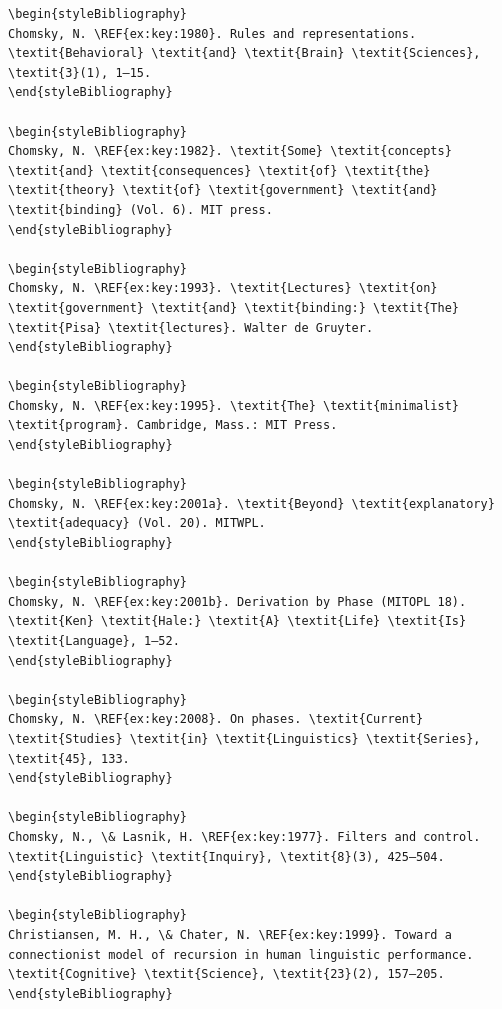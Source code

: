 \begin{verbatim}
\begin{styleBibliography}
Chomsky, N. \REF{ex:key:1980}. Rules and representations. \textit{Behavioral} \textit{and} \textit{Brain} \textit{Sciences}, \textit{3}(1), 1–15.
\end{styleBibliography}

\begin{styleBibliography}
Chomsky, N. \REF{ex:key:1982}. \textit{Some} \textit{concepts} \textit{and} \textit{consequences} \textit{of} \textit{the} \textit{theory} \textit{of} \textit{government} \textit{and} \textit{binding} (Vol. 6). MIT press.
\end{styleBibliography}

\begin{styleBibliography}
Chomsky, N. \REF{ex:key:1993}. \textit{Lectures} \textit{on} \textit{government} \textit{and} \textit{binding:} \textit{The} \textit{Pisa} \textit{lectures}. Walter de Gruyter.
\end{styleBibliography}

\begin{styleBibliography}
Chomsky, N. \REF{ex:key:1995}. \textit{The} \textit{minimalist} \textit{program}. Cambridge, Mass.: MIT Press.
\end{styleBibliography}

\begin{styleBibliography}
Chomsky, N. \REF{ex:key:2001a}. \textit{Beyond} \textit{explanatory} \textit{adequacy} (Vol. 20). MITWPL.
\end{styleBibliography}

\begin{styleBibliography}
Chomsky, N. \REF{ex:key:2001b}. Derivation by Phase (MITOPL 18). \textit{Ken} \textit{Hale:} \textit{A} \textit{Life} \textit{Is} \textit{Language}, 1–52.
\end{styleBibliography}

\begin{styleBibliography}
Chomsky, N. \REF{ex:key:2008}. On phases. \textit{Current} \textit{Studies} \textit{in} \textit{Linguistics} \textit{Series}, \textit{45}, 133.
\end{styleBibliography}

\begin{styleBibliography}
Chomsky, N., \& Lasnik, H. \REF{ex:key:1977}. Filters and control. \textit{Linguistic} \textit{Inquiry}, \textit{8}(3), 425–504.
\end{styleBibliography}

\begin{styleBibliography}
Christiansen, M. H., \& Chater, N. \REF{ex:key:1999}. Toward a connectionist model of recursion in human linguistic performance. \textit{Cognitive} \textit{Science}, \textit{23}(2), 157–205.
\end{styleBibliography}


\end{verbatim}
